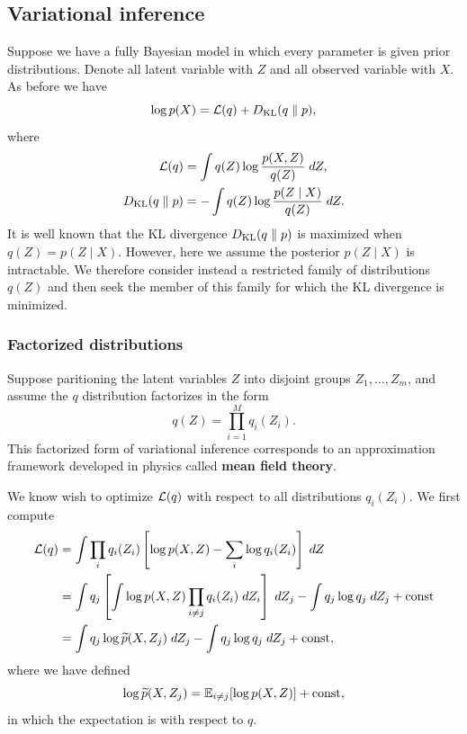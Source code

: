 \documentclass[a4paper]{article}
\begin{document}
\subsection{Variational inference}

Suppose we have a fully Bayesian model in which every parameter
is given prior distributions. Denote all latent variable with
$Z$ and all observed variable with $X$. As before we have
\[
\log p(X) = \mathcal{L}(q) + D_{\text{KL}}(q \; \Vert \; p),
\]
where
\[
\begin{aligned}
  \mathcal{L}(q) &= \int q(Z) \log \frac{p(X, Z)}{q(Z)} \; d Z, \\
  D_{\text{KL}}(q \; \Vert \; p) &= - \int q(Z) \log \frac{p(Z \mid X)}{q(Z)}
  \; d Z.
\end{aligned}
\]
It is well known that the KL divergence $D_{\text{KL}}(q \; \Vert \; p)$ is
maximized when $q(Z) = p(Z \mid X)$. However, here we
assume the posterior $p(Z \mid X)$ is intractable.
We therefore consider instead a restricted family of
distributions $q(Z)$ and then seek the member of this
family for which the KL divergence is minimized.

\subsubsection{Factorized distributions}
Suppose paritioning the latent variables $Z$ into disjoint
groups $Z_1, \dots, Z_m$, and assume the $q$ distribution
factorizes in the form
\[
q(Z) = \prod_{i=1}^M q_i(Z_i).
\]
This factorized form of variational inference corresponds to an
approximation framework developed in physics called \textbf{mean
field theory}.

We know wish to optimize $\mathcal{L}(q)$ with respect to all distributions
$q_i(Z_i)$. We first compute
\[
\begin{aligned}
\mathcal{L}(q)
&= \int \prod_i q_i(Z_i) \left[ \log p(X, Z) - \sum_i
\log q_i(Z_i) \right] \; d Z \\
&= \int q_j \left[ \int \log p(X, Z) \prod_{i \neq j}
q_i(Z_i) \; d Z_i \right] \; d Z_j
- \int q_j \log q_j \; d Z_j + \mathrm{const} \\
&= \int q_j \log \widetilde{p} (X, Z_j) \; d Z_j
- \int q_j \log q_j \; d Z_j + \mathrm{const},
\end{aligned}
\]
where we have defined
\[
\log \widetilde{p} (X, Z_j) = \mathbb{E}_{i \neq j}
[\log p(X, Z)] + \mathrm{const},
\]
in which the expectation is with respect to $q$.
\end{document}
